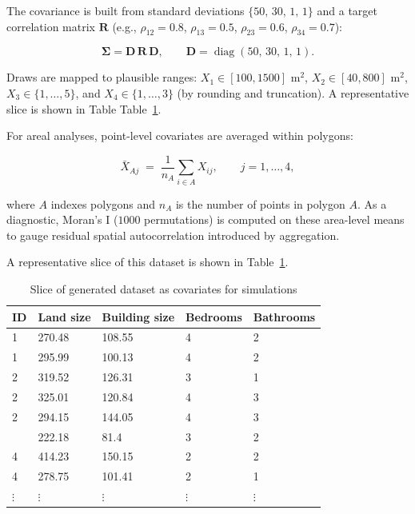 \documentclass[
  letterpaper,
  DIV=11,
  numbers=noendperiod]{scrartcl}
\begin{document}
The covariance is built from standard deviations \(\{50,\,30,\,1,\,1\}\)
and a target correlation matrix \(\mathbf R\) (e.g., \(\rho_{12}=0.8\),
\(\rho_{13}=0.5\), \(\rho_{23}=0.6\), \(\rho_{34}=0.7\)):

\[
\boldsymbol\Sigma = \mathbf D\,\mathbf R\,\mathbf D ,
\qquad \mathbf D=\operatorname{diag}(50,\,30,\,1,\,1).
\]

Draws are mapped to plausible ranges: \(X_1\in[100,1500]\) m\(^2\),
\(X_2\in[40,800]\) m\(^2\), \(X_3\in\{1,\dots,5\}\), and
\(X_4\in\{1,\dots,3\}\) (by rounding and truncation). A representative
slice is shown in Table Table~\ref{tbl-covrstr}.

For areal analyses, point-level covariates are averaged within polygons:

\[
\bar X_{Aj} \;=\; \frac{1}{n_A}\sum_{i\in A} X_{ij}, \qquad j=1,\ldots,4,
\]

where \(A\) indexes polygons and \(n_A\) is the number of points in
polygon \(A\). As a diagnostic, Moran's I (\(1000\) permutations) is
computed on these area-level means to gauge residual spatial
autocorrelation introduced by aggregation.

A representative slice of this dataset is shown in
Table~\ref{tbl-covrstr}.

\begingroup\fontsize{9}{11}\selectfont

\begin{longtable}[t]{lllll}

\caption{\label{tbl-covrstr}Slice of generated dataset as covariates for
simulations}

\tabularnewline

\toprule
ID & Land size & Building size & Bedrooms & Bathrooms\\
\midrule
1 & 270.48 & 108.55 & 4 & 2\\
1 & 295.99 & 100.13 & 4 & 2\\
2 & 319.52 & 126.31 & 3 & 1\\
2 & 325.01 & 120.84 & 4 & 3\\
2 & 294.15 & 144.05 & 4 & 3\\
\addlinespace
3 & 222.18 & 81.4 & 3 & 2\\
4 & 414.23 & 150.15 & 2 & 2\\
4 & 278.75 & 101.41 & 2 & 1\\
$\vdots$ & $\vdots$ & $\vdots$ & $\vdots$ & $\vdots$\\
\bottomrule

\end{longtable}
\end{document}
